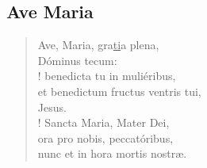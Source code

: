 \subsection*{Ave Maria}
\vspace{-0.5em}

\begin{verse}
        Ave, Maria, gra\ul{ti}a plena,
\\\vin      D\'ominus tecum:
%
\\!     benedicta tu in muli\'eribus,
\\      et benedictum fructus ventris tui,
\\\vin      Jesus.
%
\\!     Sancta Maria, Mater Dei,
\\      ora pro nobis, peccat\'oribus,
\\      nunc et in hora mortis nostræ.
\end{verse}